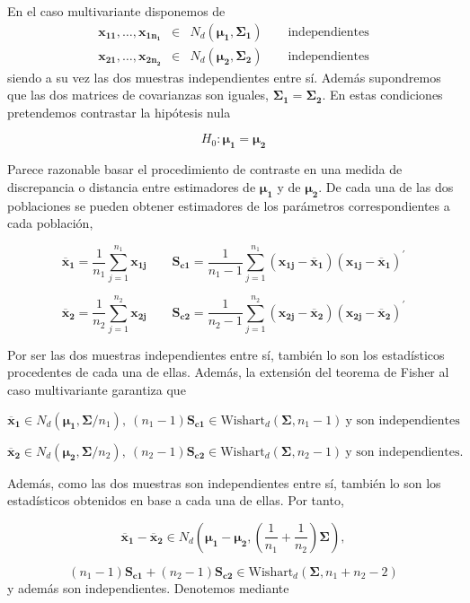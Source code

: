 \documentclass[
  a4paper,
  oneside]{scrbook}
\theoremstyle{definition}
\theoremstyle{definition}
\theoremstyle{definition}
\theoremstyle{definition}
\theoremstyle{remark}
\begin{document}
En el caso multivariante disponemos de \[\begin{aligned}
\bm{x_{11}},\ldots,\bm{x_{1n_1}}&\in & N_d(\bm{\mu_1},\bm{\Sigma_1}) \qquad \mbox{independientes}\\
\bm{x_{21}},\ldots,\bm{x_{2n_2}}&\in & N_d(\bm{\mu_2},\bm{\Sigma_2}) \qquad \mbox{independientes}\end{aligned}\]
siendo a su vez las dos muestras independientes entre sí. Además
supondremos que las dos matrices de covarianzas son iguales,
\(\bm{\Sigma_1}=\bm{\Sigma_2}\). En estas condiciones pretendemos
contrastar la hipótesis nula

\[H_0:\bm{\mu_1}=\bm{\mu_2}\]

Parece razonable basar el procedimiento de contraste en una medida de
discrepancia o distancia entre estimadores de \(\bm{\mu_1}\) y de
\(\bm{\bm{\mu_2}}\). De cada una de las dos poblaciones se pueden obtener
estimadores de los parámetros correspondientes a cada población,

\[\bm{\overline{x}_1}=\frac{1}{n_1}\sum_{j=1}^{n_1} \bm{x_{1j}}
\qquad \bm{S_{c1}}=\frac{1}{n_1-1}
\sum_{j=1}^{n_1} \left(\bm{x_{1j}}-\bm{\overline{x}_1}\right)\left(\bm{x_{1j}}-\bm{\overline{x}_1}\right)^\prime{}\]

\[\bm{\overline{x}_2}=\frac{1}{n_2}\sum_{j=1}^{n_2} \bm{x_{2j}}
\qquad \bm{S_{c2}}=\frac{1}{n_2-1}
\sum_{j=1}^{n_2} \left(\bm{x_{2j}}-\bm{\overline{x}_2}\right)\left(\bm{x_{2j}}-\bm{\overline{x}_2}\right)^\prime{}\]

Por ser las dos muestras independientes entre sí, también lo son los
estadísticos procedentes de cada una de ellas. Además, la extensión del
teorema de Fisher al caso multivariante garantiza que

\[\bm{\overline{x}_1}\in N_d\left(\bm{\mu_1},\bm\Sigma/n_1\right),
\ \left(n_1-1\right)\bm{S_{c1}} \in \mbox{Wishart}_d\left(\bm\Sigma,n_1-1\right)
\ \mbox{y son independientes}\]

\[\bm{\overline{x}_2}\in N_d\left(\bm{\mu_2},\bm\Sigma/n_2\right),\ \left(n_2-1\right)\bm{S_{c2}} \in \mbox{Wishart}_d\left(\bm\Sigma,n_2-1\right)\ 
\mbox{y son independientes}.\]

Además, como las dos muestras son
independientes entre sí, también lo son los estadísticos obtenidos en
base a cada una de ellas. Por tanto,

\[\bm{\overline{x}_1}-\bm{\overline{x}_2}
\in N_d\left(\bm{\mu_1}-\bm{\mu_2},\left(\frac{1}{n_1}+\frac{1}{n_2}\right)\bm\Sigma\right),\]

\[\left(n_1-1\right)\bm{S_{c1}}+\left(n_2-1\right)\bm{S_{c2}}
\in \mbox{Wishart}_d\left(\bm\Sigma,n_1+n_2-2\right)\] y además son
independientes. Denotemos mediante
\end{document}
